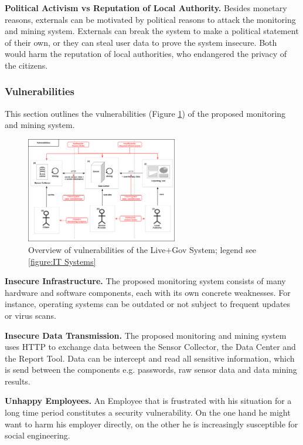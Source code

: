 \documentclass[runningheads,a4paper]{llncs}
\begin{document}
\textbf{Political Activism vs Reputation of Local Authority.}
Besides monetary reasons, externals can be motivated by political reasons to attack the monitoring and mining system.
Externals can break the system to make a political statement of their own,
or they can steal user data to prove the system insecure.
Both would harm the reputation of local authorities, who endangered the privacy of the citizens.


\subsubsection{Vulnerabilities}
\label{subsubsection:Vulnerabilities}
This section outlines the vulnerabilities (Figure \ref{figure:Live+Gov Vulnerabilities}) of the proposed monitoring and mining system. 

\begin{figure}
\centering
\includegraphics[width=0.6\textwidth]{diagrams/png/vulnerabilities.png}

\caption{Overview of vulnerabilities of the Live+Gov System; legend see \ref{figure:IT Systems} }
\label{figure:Live+Gov Vulnerabilities}
\end{figure}

\textbf{Insecure Infrastructure.}
The proposed monitoring system consists of many hardware and software components, each with its own concrete weaknesses. For instance, operating systems can be outdated or not subject to frequent updates or virus scans.

\textbf{Insecure Data Transmission.}
The proposed monitoring and mining system uses HTTP to exchange data between the Sensor Collector, the Data Center and the Report Tool.
Data can be intercept and read all sensitive information, which is send between the components e.g. passwords, raw sensor data and data mining results.

\textbf{Unhappy Employees.}
An Employee that is frustrated with his situation for a long time
period constitutes a security vulnerability. On the one hand he might
want to harm his employer directly, on the other he is increasingly
susceptible for social engineering.
\end{document}
